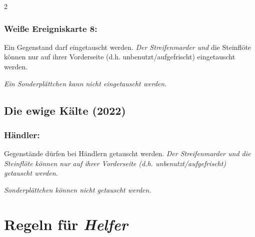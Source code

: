 \documentclass[10pt, a4paper, oneside]{book}
\newcommand{\fan}[1]{\textit{#1}}
\begin{document}
\begin{multicols*}{2}
\begin{bgcolor}[color-BB]
\subsection{Weiße Ereigniskarte 8:}

Ein Gegenstand darf eingetauscht werden.
\fan{Der Streifenmarder und} die Steinflöte können nur auf ihrer Vorderseite (d.h. unbenutzt/aufgefrischt) eingetauscht werden. 
\supercite{BB:Ereigniskarte_8}

\fan{Ein Sonderplättchen kann nicht eingetauscht werden.}



\end{bgcolor}



\begin{bgcolor}
\section{Die ewige Kälte (2022)}

\subsection{Händler:}

Gegenstände dürfen bei Händlern getauscht werden.
\fan{Der Streifenmarder und die Steinflöte können nur auf ihrer Vorderseite (d.h. unbenutzt/aufgefrischt) getauscht werden.}

\fan{Sonderplättchen können nicht getauscht werden.}

\end{bgcolor}



\end{multicols*}






\chapter{Regeln für \fan{Helfer}}
\label{Helfer}
\end{document}
